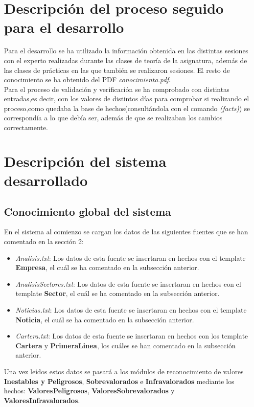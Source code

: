 \section{Descripción del proceso seguido para el desarrollo}
Para el desarrollo se ha utilizado la información obtenida en las distintas sesiones con el experto realizadas durante las clases de teoría de la asignatura, además de las clases de prácticas en las que también se realizaron sesiones. El resto de conocimiento se ha obtenido del PDF \textit{conocimiento.pdf}.\\
Para el proceso de validación y verificación se ha comprobado con distintas entradas,es decir, con los valores de distintos días para comprobar si realizando el proceso,como quedaba la base de hechos(consultándola con el comando \textit{(facts)}) se correspondía a lo que debía ser, además de que se realizaban los cambios correctamente.

\section{Descripción del sistema desarrollado }
\subsection{Conocimiento global del sistema}
En el sistema al comienzo se cargan los datos de las siguientes fuentes que se han comentado en la sección 2:
\begin{itemize}
	\item \textit{Analisis.txt}: Los datos de esta fuente se insertaran en hechos con el template \textbf{Empresa}, el cuál se ha comentado en la subsección anterior.
	\item \textit{AnalisisSectores.txt}: Los datos de esta fuente se insertaran en hechos con el template \textbf{Sector}, el cuál se ha comentado en la subsección anterior.
	\item \textit{Noticias.txt}: Los datos de esta fuente se insertaran en hechos con el template \textbf{Noticia}, el cuál se ha comentado en la subsección anterior.
	\item \textit{Cartera.txt}: Los datos de esta fuente se insertaran en hechos con los template \textbf{Cartera} y \textbf{PrimeraLinea}, los cuáles se han comentado en la subsección anterior.	
\end{itemize}
Una vez leídos estos datos se pasará a los módulos de reconocimiento de valores \textbf{Inestables y Peligrosos}, \textbf{Sobrevalorados} e \textbf{Infravalorados} mediante los hechos: \textbf{ValoresPeligrosos}, \textbf{ValoresSobrevalorados} y \textbf{ValoresInfravalorados}.
